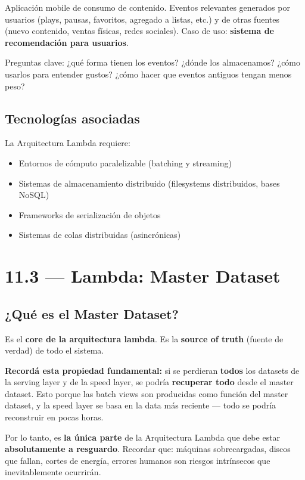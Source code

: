 \documentclass[11pt, a4paper]{article}
\begin{document}
Aplicación mobile de consumo de contenido. Eventos relevantes generados por usuarios (plays, pausas, favoritos, agregado a listas, etc.) y de otras fuentes (nuevo contenido, ventas físicas, redes sociales). Caso de uso: \textbf{sistema de recomendación para usuarios}.

Preguntas clave: ¿qué forma tienen los eventos? ¿dónde los almacenamos? ¿cómo usarlos para entender gustos? ¿cómo hacer que eventos antiguos tengan menos peso?

\subsection{Tecnologías asociadas}

La Arquitectura Lambda requiere:
\begin{itemize}
	\item Entornos de cómputo paralelizable (batching y streaming)
	\item Sistemas de almacenamiento distribuido (filesystems distribuidos, bases NoSQL)
	\item Frameworks de serialización de objetos
	\item Sistemas de colas distribuidas (asincrónicas)
\end{itemize}

\section{11.3 — Lambda: Master Dataset}

\subsection{¿Qué es el Master Dataset?}

Es el \textbf{core de la arquitectura lambda}. Es la \textbf{source of truth} (fuente de verdad) de todo el sistema.

\begin{recallbox}
	\textbf{Recordá esta propiedad fundamental:} si se perdieran \textbf{todos} los datasets de la serving layer y de la speed layer, se podría \textbf{recuperar todo} desde el master dataset. Esto porque las batch views son producidas como función del master dataset, y la speed layer se basa en la data más reciente --- todo se podría reconstruir en pocas horas.

	Por lo tanto, es \textbf{la única parte} de la Arquitectura Lambda que debe estar \textbf{absolutamente a resguardo}. Recordar que: máquinas sobrecargadas, discos que fallan, cortes de energía, errores humanos son riesgos intrínsecos que inevitablemente ocurrirán.
\end{recallbox}
\end{document}
